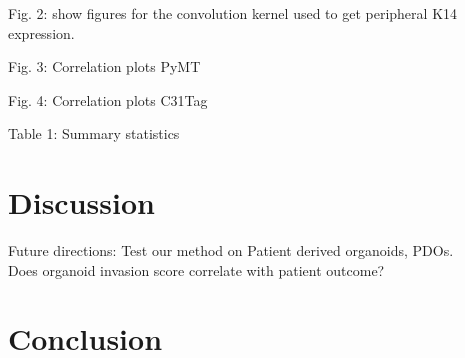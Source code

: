 \documentclass[runningheads]{llncs}
\begin{document}
Fig. 2: show figures for the convolution kernel used to get peripheral K14 expression.

Fig. 3: Correlation plots PyMT

Fig. 4: Correlation plots C31Tag

Table 1: Summary statistics

\section{Discussion}

Future directions: Test our method on Patient derived organoids, PDOs.\\
Does organoid invasion score correlate with patient outcome?

\section{Conclusion}
\end{document}
